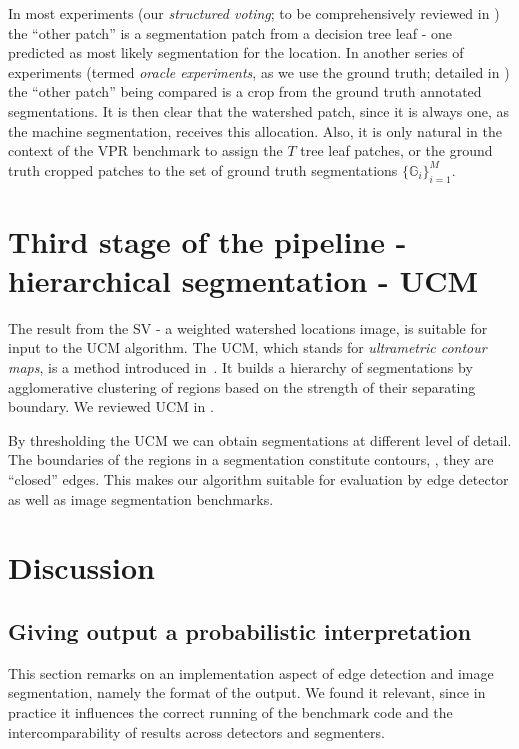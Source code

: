 In most experiments (our {\it structured voting}; to be comprehensively %
reviewed in ) the ``other patch'' is a segmentation patch from a decision tree leaf - one predicted as most likely segmentation for the location. In another series of experiments (termed {\it oracle experiments}, as we use the ground truth; detailed in ) the ``other patch'' being compared is a crop from the ground truth annotated segmentations.
It is then clear that the watershed patch, since it is always one, as the machine segmentation, receives this allocation. Also, it is only natural in the context of the VPR benchmark to assign the $T$ tree leaf patches, or the ground truth cropped patches to the set of ground truth segmentations $\{\mathbb{G}_i\}_{i=1}^M$.

\section[Third stage of the pipeline - UCM]{Third stage of the pipeline - hierarchical segmentation - UCM}
The result from the SV - a weighted watershed locations image, is suitable for input to the UCM algorithm. The UCM, which stands for {\it ultrametric contour maps}, is a method introduced in~\cite{Arbelaez2006boundary}. It builds a hierarchy of segmentations by agglomerative clustering of regions based on the strength of their separating boundary. We reviewed UCM in . 

By thresholding the UCM we can obtain segmentations at different level of detail. The boundaries of the regions in a segmentation constitute contours, \ie, they are ``closed'' edges. This makes our algorithm suitable for evaluation by edge detector as well as image segmentation benchmarks.

\section{Discussion}
\subsection{Giving output a probabilistic interpretation}
This section remarks on an implementation aspect of edge detection and image segmentation, namely the format of the output. We found it relevant, since in practice it influences the correct running of the benchmark code and the intercomparability %
of results across detectors and segmenters.

